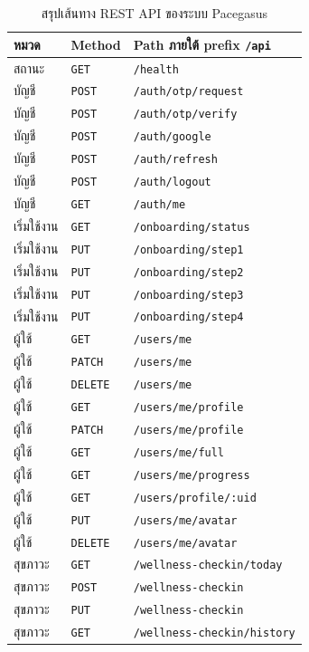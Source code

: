 \begin{table}[H]
\centering
\setlength{\tabcolsep}{3pt}
\renewcommand{\arraystretch}{1.08}
\caption{สรุปเส้นทาง REST API ของระบบ Pacegasus}\label{tab:api-spec-endpoints}
\begin{tabular}{|>{\raggedright\arraybackslash\normalsize}p{}|>{\raggedright\arraybackslash\normalsize}p{}|>{\raggedright\arraybackslash\fontsize{9.25}{11.5}\selectfont}p{}|}
\hline
\textbf{หมวด} & \textbf{Method} & \textbf{Path ภายใต้ prefix \texttt{/api}} \\ \hline
สถานะ & \texttt{GET} & \texttt{/health} \\
บัญชี & \texttt{POST} & \texttt{/auth/otp/request} \\
บัญชี & \texttt{POST} & \texttt{/auth/otp/verify} \\
บัญชี & \texttt{POST} & \texttt{/auth/google} \\
บัญชี & \texttt{POST} & \texttt{/auth/refresh} \\
บัญชี & \texttt{POST} & \texttt{/auth/logout} \\
บัญชี & \texttt{GET} & \texttt{/auth/me} \\
เริ่มใช้งาน & \texttt{GET} & \texttt{/onboarding/status} \\
เริ่มใช้งาน & \texttt{PUT} & \texttt{/onboarding/step1} \\
เริ่มใช้งาน & \texttt{PUT} & \texttt{/onboarding/step2} \\
เริ่มใช้งาน & \texttt{PUT} & \texttt{/onboarding/step3} \\
เริ่มใช้งาน & \texttt{PUT} & \texttt{/onboarding/step4} \\
ผู้ใช้ & \texttt{GET} & \texttt{/users/me} \\
ผู้ใช้ & \texttt{PATCH} & \texttt{/users/me} \\
ผู้ใช้ & \texttt{DELETE} & \texttt{/users/me} \\
ผู้ใช้ & \texttt{GET} & \texttt{/users/me/profile} \\
ผู้ใช้ & \texttt{PATCH} & \texttt{/users/me/profile} \\
ผู้ใช้ & \texttt{GET} & \texttt{/users/me/full} \\
ผู้ใช้ & \texttt{GET} & \texttt{/users/me/progress} \\
ผู้ใช้ & \texttt{GET} & \texttt{/users/profile/:uid} \\
ผู้ใช้ & \texttt{PUT} & \texttt{/users/me/avatar} \\
ผู้ใช้ & \texttt{DELETE} & \texttt{/users/me/avatar} \\
สุขภาวะ & \texttt{GET} & \texttt{/wellness-checkin/today} \\
สุขภาวะ & \texttt{POST} & \texttt{/wellness-checkin} \\
สุขภาวะ & \texttt{PUT} & \texttt{/wellness-checkin} \\
สุขภาวะ & \texttt{GET} & \texttt{/wellness-checkin/history} \\
\hline
\end{tabular}
\end{table}

